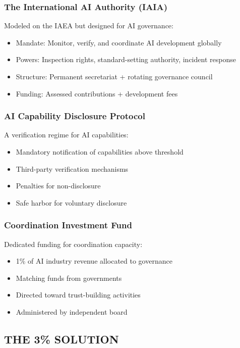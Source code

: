 \documentclass[11pt,letterpaper]{article}
\begin{document}
\subsubsection{The International AI Authority (IAIA)}

Modeled on the IAEA but designed for AI governance:
\begin{itemize}
\item Mandate: Monitor, verify, and coordinate AI development globally
\item Powers: Inspection rights, standard-setting authority, incident response
\item Structure: Permanent secretariat + rotating governance council
\item Funding: Assessed contributions + development fees
\end{itemize}

\subsubsection{AI Capability Disclosure Protocol}

A verification regime for AI capabilities:
\begin{itemize}
\item Mandatory notification of capabilities above threshold
\item Third-party verification mechanisms
\item Penalties for non-disclosure
\item Safe harbor for voluntary disclosure
\end{itemize}

\subsubsection{Coordination Investment Fund}

Dedicated funding for coordination capacity:
\begin{itemize}
\item 1\% of AI industry revenue allocated to governance
\item Matching funds from governments
\item Directed toward trust-building activities
\item Administered by independent board
\end{itemize}

\subsection{THE 3\% SOLUTION}
\end{document}
